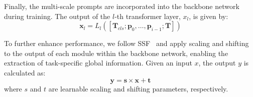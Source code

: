 Finally, the multi-scale prompts are incorporated into the backbone network during training. The output of the $l$-th transformer layer, $x_l$, is given by:
\begin{equation}
	\boldsymbol{x}_l = L_l\left(\left[\boldsymbol{T}_{cls} ; \boldsymbol{p}_{0}, \ldots, \boldsymbol{p}_{i-1} ; \boldsymbol{T}\right]\right)
\end{equation}

To further enhance performance, we follow SSF~\cite{lian2022scaling} and apply scaling and shifting to the output of each module within the backbone network, enabling the extraction of task-specific global information. Given an input $x$, the output $y$ is calculated as:
\begin{equation}
	\boldsymbol{y} = \boldsymbol{s} \times \boldsymbol{x} + \boldsymbol{t}
\end{equation}
where $s$ and $t$ are learnable scaling and shifting parameters, respectively.


